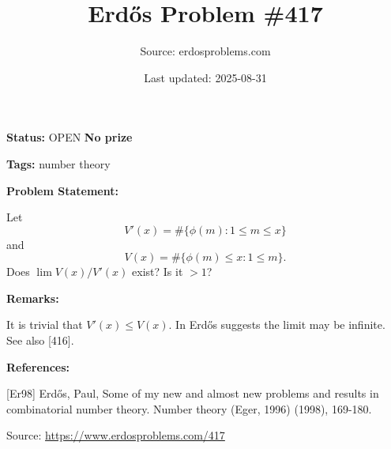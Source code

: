 \documentclass{article}
\title{Erd\H{o}s Problem \#417}
\date{Last updated: 2025-08-31}
\author{Source: erdosproblems.com}
\begin{document}
\maketitle

\noindent\textbf{Status:} OPEN \quad \textbf{No prize}

\noindent\textbf{Tags:} number theory

\medskip
\noindent\textbf{Problem Statement:}

Let\[V'(x)=\#\{\phi(m) : 1\leq m\leq x\}\]and\[V(x)=\#\{\phi(m) \leq x : 1\leq m\}.\]Does $\lim V(x)/V'(x)$ exist? Is it $>1$?

\bigskip
\noindent\textbf{Remarks:}

It is trivial that $V'(x) \leq V(x)$. In \cite{Er98} Erd\H{o}s suggests the limit may be infinite. See also [416].

\bigskip
\noindent\textbf{References:}

[Er98] Erd\H{o}s, Paul, Some of my new and almost new problems and results in combinatorial number theory. Number theory (Eger, 1996) (1998), 169-180.

\bigskip
\noindent\small{Source: \url{https://www.erdosproblems.com/417}}
\end{document}
